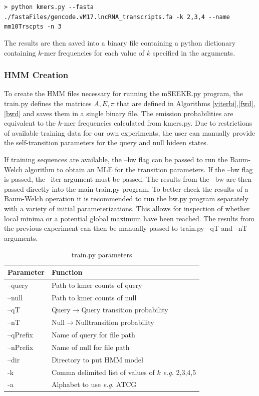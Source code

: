 \lstinline{> python kmers.py --fasta ./fastaFiles/gencode.vM17.lncRNA_transcripts.fa -k 2,3,4 --name mm10Trscpts -n 3}

The results are then saved into a binary file containing a python dictionary containing $k$-mer frequencies for each value of $k$ specified in the arguments. 

\subsubsection{HMM Creation}
To create the HMM files necessary for running the mSEEKR.py program, the train.py defines the matrices $A,E,\pi$ that are defined in Algorithms \ref{viterbi},\ref{fwd},\ref{bwd} and saves them in a single binary file. The emission probabilities are equivalent to the $k$-mer frequencies calculated from kmers.py. Due to restrictions of available training data for our own experiments, the user can manually provide the self-transition parameters for the query and null hideen states.

If training sequences are available, the --bw flag can be passed to run the Baum-Welch algorithm to obtain an MLE for the transition parameters. If the --bw flag is passed, the --iter argument must be passed. The results from the --bw are then passed directly into the main train.py program. To better check the results of a Baum-Welch operation it is recommended to run the bw.py program separately with a variety of initial parameterizations. This allows for inspection of whether local minima or a potential global maximum have been reached. The results from the previous experiment can then be manually passed to train.py --qT and --nT arguments.
\begin{table}[h]
\centering
 \begin{tabular}{|l l|}
 \hline
 Parameter & Function\\
 \hline
 --query & Path to kmer counts of query \\
 --null & Path to kmer counts of null \\
 --qT & Query$\rightarrow$Query transition probability \\
 --nT & Null$\rightarrow$Nulltransition probability \\
 --qPrefix & Name of query for file path \\
 --nPrefix & Name of null for file path\\
 --dir & Directory to put HMM model \\
 -k & Comma delimited list of values of $k$ \emph{e.g.} 2,3,4,5\\
 -a & Alphabet to use \emph{e.g.} ATCG\\
 \hline
 
\end{tabular}
\caption{train.py parameters}
\label{tab:trainparams}
\end{table}
\linebreak

